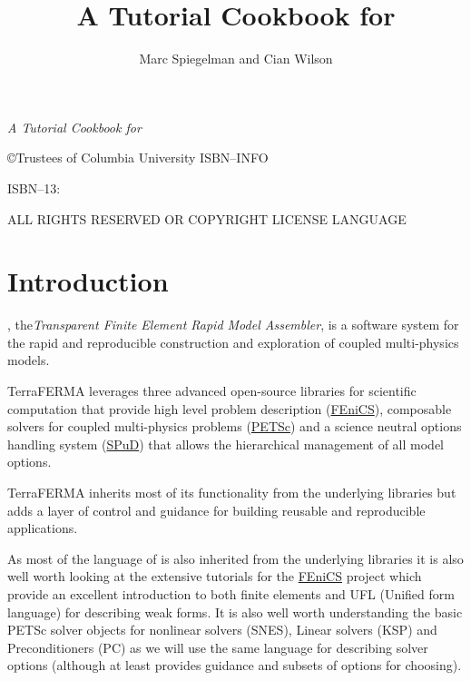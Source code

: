 \documentclass[10pt,twoside,openright]{memoir}
\author{Marc Spiegelman and Cian Wilson}
\title{A Tutorial Cookbook for \TF{}}
\date{}
\makeatletter
\def\maketitle{%
  \null
  \thispagestyle{empty}%
  \vfill
  \begin{center}\leavevmode
    \normalfont
    {\LARGE\raggedleft \@author\par}%
    \hrulefill\par
    {\huge\raggedright \@title\par}%
    \vskip 1cm
  \end{center}%
  \vfill
  \null
  \cleardoublepage
  }
\makeatother
\begin{document}
\pagestyle{headings}
\let\cleardoublepage\clearpage


\maketitle






\frontmatter

\null\vfill

\begin{flushleft}
\textit{A Tutorial Cookbook for \TF}


\copyright{Trustees of Columbia University}
ISBN--INFO

ISBN--13: 
\bigskip





ALL RIGHTS RESERVED OR COPYRIGHT LICENSE LANGUAGE




\end{flushleft}
\let\cleardoublepage\clearpage

\newpage
\tableofcontents*
\mainmatter
\sloppy

\chapter{Introduction}

\TF{},  the\emph{Transparent Finite Element Rapid Model Assembler}, is
a software system for the rapid and reproducible construction and exploration of coupled multi-physics models.

TerraFERMA leverages three advanced open-source libraries for
scientific computation that provide high level problem description
(\href{http://fenicsproject.org}{FEniCS}), composable solvers for
coupled multi-physics problems
(\href{https://www.mcs.anl.gov/petsc}{PETSc}) and a science neutral
options handling system
(\href{http://www3.imperial.ac.uk/earthscienceandengineering/research/amcg/spud}{SPuD})
that allows the hierarchical management of all model options.

TerraFERMA inherits most of its functionality from the underlying
libraries but adds a layer of control and guidance for building
reusable and reproducible applications.

As most of the language of \TF{} is also inherited from the underlying
libraries it is also well worth looking at the extensive tutorials for
the \href{http://fenicsproject.org/documentation/tutorial}{FEniCS} project which provide an
excellent introduction to both finite elements and UFL (Unified form
language) for describing weak forms.  It is also well worth
understanding the basic PETSc solver objects for nonlinear solvers
(SNES), Linear solvers (KSP) and Preconditioners (PC) as we will use
the same language for describing solver options (although \TF{} at
least provides guidance and subsets of options for choosing).
\end{document}
